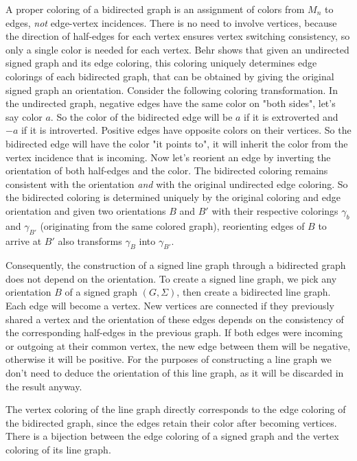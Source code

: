 A proper coloring of a bidirected graph is an assignment of colors from $M_n$ to edges, \textit{not} edge-vertex incidences. 
There is no need to involve vertices, because the direction of half-edges for each vertex ensures vertex switching consistency, so only a single color is needed for each vertex.
Behr shows that given an undirected signed graph and its edge coloring, this coloring uniquely determines edge colorings of each bidirected graph, that can be obtained by giving the original signed graph an orientation.
Consider the following coloring transformation. In the undirected graph, negative edges have the same color on "both sides", let's say color $a$. So the color of the bidirected edge will be $a$ if it is extroverted and $-a$ if it is introverted.
Positive edges have opposite colors on their vertices. So the bidirected edge will have the color "it points to", it will inherit the color from the vertex incidence that is incoming.
Now let's reorient an edge by inverting the orientation of both half-edges and the color. The bidirected coloring remains consistent with the orientation \textit{and} with the original undirected edge coloring.
So the bidirected coloring is determined uniquely by the original coloring and edge orientation and given two orientations $B$ and $B'$ with their respective colorings $\gamma _b$ and $\gamma _{B'}$ (originating from the same colored graph),
reorienting edges of $B$ to arrive at $B'$ also transforms $\gamma _B$ into $\gamma _{B'}$.

Consequently, the construction of a signed line graph through a bidirected graph does not depend on the orientation. To create a signed line graph,
we pick any orientation $B$ of a signed graph $(G, \Sigma)$, then create a bidirected line graph. Each edge will become a vertex.
New vertices are connected if they previously shared a vertex and the orientation of these edges depends on the consistency of the corresponding half-edges in the previous graph.
If both edges were incoming or outgoing at their common vertex, the new edge between them will be negative, otherwise it will be positive. 
For the purposes of constructing a line graph we don't need to deduce the orientation of this line graph, as it will be discarded in the result anyway.

The vertex coloring of the line graph directly corresponds to the edge coloring of the bidirected graph, since the edges retain their color after becoming vertices.
There is a bijection between the edge coloring of a signed graph and the vertex coloring of its line graph.
